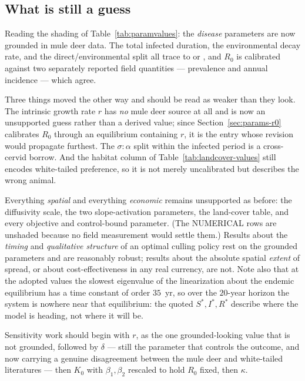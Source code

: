 \documentclass[11pt]{article}
\newcommand{\tagNUM}{{\footnotesize\textsf{\textcolor{purple!70!black}{NUMERICAL}}}}
\begin{document}
\subsection{What is still a guess}

Reading the shading of Table~\ref{tab:paramvalues}: the \emph{disease} parameters are now grounded in mule deer data. The total infected duration, the environmental decay rate, and the direct/environmental split all trace to \citet{Miller2006} or \citet{Geremia2015}, and $R_0$ is calibrated against two separately reported field quantities --- prevalence and annual incidence --- which agree.

Three things moved the other way and should be read as weaker than they look. The intrinsic growth rate $r$ has \emph{no} mule deer source at all and is now an unsupported guess rather than a derived value; since Section~\ref{sec:params-r0} calibrates $R_0$ through an equilibrium containing $r$, it is the entry whose revision would propagate furthest. The $\sigma\!:\!\alpha$ split within the infected period is a cross-cervid borrow. And the habitat column of Table~\ref{tab:landcover-values} still encodes white-tailed preference, so it is not merely uncalibrated but describes the wrong animal.

Everything \emph{spatial} and everything \emph{economic} remains unsupported as before: the diffusivity scale, the two slope-activation parameters, the land-cover table, and every objective and control-bound parameter. (The \tagNUM{} rows are unshaded because no field measurement would settle them.) Results about the \emph{timing} and \emph{qualitative structure} of an optimal culling policy rest on the grounded parameters and are reasonably robust; results about the absolute spatial \emph{extent} of spread, or about cost-effectiveness in any real currency, are not. Note also that at the adopted values the slowest eigenvalue of the linearization about the endemic equilibrium has a time constant of order $35$~yr, so over the $20$-year horizon the system is nowhere near that equilibrium: the quoted $S^\ast, I^\ast, R^\ast$ describe where the model is heading, not where it will be.

Sensitivity work should begin with $r$, as the one grounded-looking value that is not grounded, followed by $\delta$ --- still the parameter that controls the outcome, and now carrying a genuine disagreement between the mule deer and white-tailed literatures --- then $K_0$ with $\beta_1,\beta_2$ rescaled to hold $R_0$ fixed, then $\kappa$.
\end{document}
